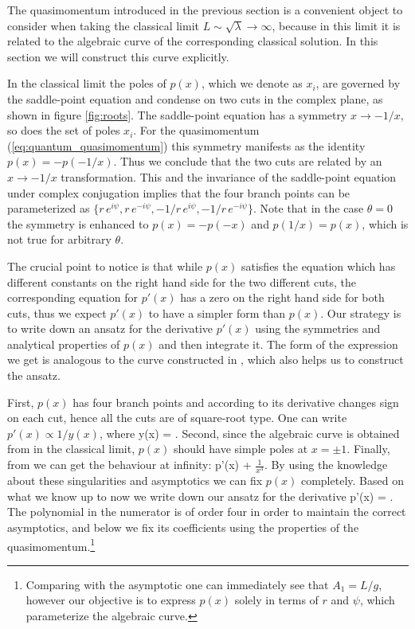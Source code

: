 The quasimomentum  introduced in the previous section is a convenient object to consider when taking the classical limit $L\sim \sqrt \lambda\rightarrow\infty$, because in this limit it is related to the algebraic curve of the corresponding classical solution. In this section we will construct this curve explicitly.

In the classical limit the poles of $p(x)$, which we denote as $x_i$, are governed by the saddle-point equation and condense on two cuts in the complex plane, as shown in figure \ref{fig:roots}.
The saddle-point equation  has a symmetry $x\rightarrow -1/x$, so does the set of poles $x_i$. For the quasimomentum (\ref{eq:quantum_quasimomentum}) this symmetry manifests as the identity $p(x) = -p(-1/x)$. Thus we conclude that the two cuts are related by an $x\rightarrow -1/x$ transformation. This and the invariance of the saddle-point equation under complex conjugation implies that the four branch points can be parameterized as $\{r\,e^{i\psi},r \, e^{-i\psi},-1/r \, e^{i\psi},-1/r \, e^{-i\psi}\}$. Note that in the case $\theta=0$ the symmetry is enhanced to $p(x)=-p(-x)$ and $p(1/x) = p(x)$, which is not true for arbitrary $\theta$.

The crucial point to notice is that while $p(x)$ satisfies the equation  which has different constants on the right hand side for the two different cuts, the corresponding equation for $p'(x)$ has a zero on the right hand side for both cuts, thus we expect $p'(x)$ to have a simpler form than $p(x)$. Our strategy is to write down an ansatz for the derivative $p'(x)$ using the symmetries and analytical properties of $p(x)$ and then integrate it. The form of the expression we get is analogous to the curve constructed in \cite{Kazakov:2004qf}, which also helps us to construct the ansatz.

First, $p(x)$ has four branch points and according to  its derivative changes sign on each cut, hence all the cuts are of square-root type. One can write $p'(x)\propto 1/y(x)$, where
 \beq
 	y(x) = .
 \label{eq:y}
 \eeq
  Second, since the algebraic curve is obtained from  in the classical limit, $p(x)$ should have simple poles at $x=\pm 1$. Finally, from   we can get the behaviour at infinity:
\beq
	p'(x) \approx {}  + \(\frac{1}{x^3}\).
\eeq
By using the knowledge about these singularities and asymptotics we can fix $p(x)$ completely. Based on what we know up to now we write down our ansatz for the derivative
\beq
	p'(x) = .
\eeq
The polynomial in the numerator is of order four in order to maintain the correct asymptotics, and below we fix its coefficients using the properties of the quasimomentum.\footnote{Comparing with the asymptotic one can immediately see that $A_1 = L/g$, however our objective is to express $p(x)$ solely in terms of $r$ and $\psi$, which parameterize the algebraic curve.}

